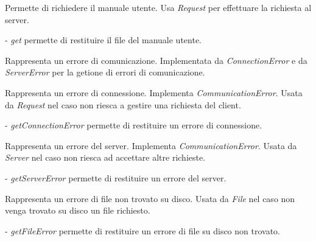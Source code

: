 Permette di richiedere il manuale utente.
Usa \textit{Request} per effettuare la richiesta al server.
\begin{elencopuntato}[\normindent]
\item[-] \textit{get} permette di restituire il file del manuale utente.
\end{elencopuntato}

Rappresenta un errore di comunicazione.
Implementata da \textit{ConnectionError} e da \textit{ServerError} per la getione di errori di comunicazione.

Rappresenta un errore di connessione.
Implementa \textit{CommunicationError}.
Usata da \textit{Request} nel caso non riesca a gestire una richiesta del client.
\begin{elencopuntato}[\normindent]
\item[-] \textit{getConnectionError} permette di restituire un errore di connessione.
\end{elencopuntato}

Rappresenta un errore del server.
Implementa \textit{CommunicationError}.
Usata da \textit{Server} nel caso non riesca ad accettare altre richieste.
\begin{elencopuntato}[\normindent]
\item[-] \textit{getServerError} permette di restituire un errore del server.
\end{elencopuntato}

Rappresenta un errore di file non trovato su disco.
Usata da \textit{File} nel caso non venga trovato su disco un file richiesto.
\begin{elencopuntato}[\normindent]
\item[-] \textit{getFileError} permette di restituire un errore di file su disco non trovato.
\end{elencopuntato}

